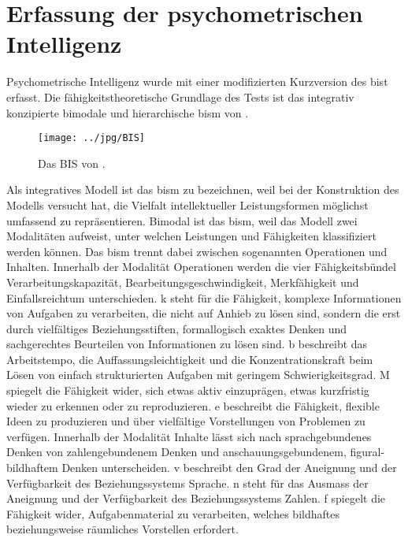 \documentclass[11pt, twoside, a4paper]{book}		%
\begin{document}
\section{Erfassung der psychometrischen Intelligenz \label{sec:Intelligenz}}



Psychometrische Intelligenz wurde mit einer modifizierten Kurzversion des \acrlong{bist} \citep[\gls{bist};][]{Jaeger1997} erfasst. Die fähigkeitstheoretische Grundlage des Tests ist das integrativ konzipierte bimodale und hierarchische \gls{bism} von \citet[][siehe \autoref{fig:BIS}]{Jaeger1984}. 
\begin{figure}[htb]
	\centering
	\texttt{[image: ../jpg/BIS]}
	\caption[Das BIS]{Das BIS von \citet{Jaeger1984}.}
	\label{fig:BIS}
\end{figure} 

Als integratives Modell ist das \gls{bism} zu bezeichnen, weil \citet{Jaeger1984} bei der Konstruktion des Modells versucht hat, die Vielfalt intellektueller Leistungsformen möglichst umfassend zu repräsentieren.
Bimodal ist das \gls{bism}, weil das Modell zwei Modalitäten aufweist, unter welchen Leistungen und Fähigkeiten klassifiziert werden können. 
Das \gls{bism} trennt dabei zwischen sogenannten Operationen und Inhalten. Innerhalb der Modalität Operationen werden die vier Fähigkeitsbündel Verarbeitungskapazität, Bearbeitungsgeschwindigkeit, Merkfähigkeit und Einfallsreichtum unterschieden. 
\gls{k} steht für die Fähigkeit, komplexe Informationen von Aufgaben zu verarbeiten, die nicht auf Anhieb zu lösen sind, sondern die erst durch vielfältiges Beziehungsstiften, formallogisch exaktes Denken und sachgerechtes Beurteilen von Informationen zu lösen sind. 
\gls{b} beschreibt das Arbeitstempo, die Auffassungsleichtigkeit und die Konzentrationskraft beim Lösen von einfach strukturierten Aufgaben mit geringem Schwierigkeitsgrad. 
\gls{M} spiegelt die Fähigkeit wider, sich etwas aktiv einzuprägen, etwas kurzfristig wieder zu erkennen oder zu reproduzieren. 
\gls{e} beschreibt die Fähigkeit, flexible Ideen zu produzieren und über vielfältige Vorstellungen von Problemen zu verfügen. 
Innerhalb der Modalität Inhalte lässt sich nach \citet{Jaeger1984} sprachgebundenes Denken von zahlengebundenem Denken und anschauungsgebundenem, figural-bildhaftem Denken unterscheiden.
\Gls{v} beschreibt den Grad der Aneignung und der Verfügbarkeit des Beziehungssystems Sprache.
\Gls{n} steht für das Ausmass der Aneignung und der Verfügbarkeit des Beziehungssystems Zahlen.
\Gls{f} spiegelt die Fähigkeit wider, Aufgabenmaterial zu verarbeiten, welches bildhaftes beziehungsweise räumliches Vorstellen erfordert.
\end{document}
